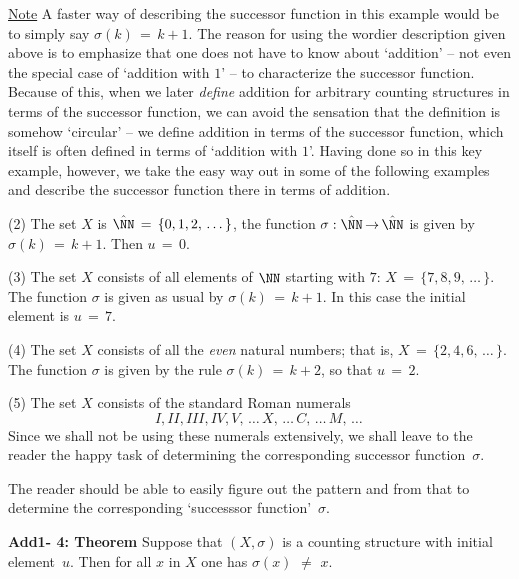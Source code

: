         \underline{Note} A faster way of describing the successor function in this example would be to simply say ${\sigma}(k) \,=\, k+1$.
    The reason for using the wordier description given above is to emphasize that one does not have to know about `addition' --
    not even the special case of `addition with $1$' -- to characterize the successor function.
    Because of this, when we later {\em define} addition for arbitrary counting structures in terms of the successor function,
    we can avoid the sensation that the definition is somehow `circular' -- we define addition in terms of the successor function,
        which itself is often defined in terms of `addition with $1$'.
    Having done so in this key example, however, we take the easy way out in some of the following examples
    and describe the successor function there in terms of addition.

\V

        (2) The set $X$ is $\hat{{\NN}} \,=\, \{0,1,2,\,{\ldots}\,\}$, the function ${\sigma}:\hat{{\NN}} \,{\rightarrow}\, \hat{{\NN}}$ is given by ${\sigma}(k) \,=\, k+1$.
    Then $u \,=\, 0$.

\V

        (3) The set $X$ consists of all elements of ${\NN}$ starting with $7$:
    $X \,=\, \{7, 8, 9, \,{\ldots}\,\}$.
    The function ${\sigma}$ is given as usual by ${\sigma}(k) \,=\, k+1$.
    In this case the initial element is $u \,=\, 7$.

\V

        (4) The set $X$ consists of all the {\em even} natural numbers; that is, $X \,=\, \{2,4,6,\,{\ldots}\,\}$.
    The function ${\sigma}$ is given by the rule ${\sigma}(k) \,=\, k+2$, so that $u \,=\, 2$.

\V

        (5) The set $X$ consists of the standard Roman numerals
        \begin{displaymath}
        I, II, III, IV, V,\,{\ldots}\,X,\,{\ldots}\,C,\,{\ldots}\,M,\,{\ldots}\,
        \end{displaymath}
    Since we shall not be using these numerals extensively, we shall leave to the reader the happy task of determining the corresponding successor function~${\sigma}$.

    The reader should be able to easily figure out the pattern and from that to determine the corresponding `successsor function'~${\sigma}$.

\V
\V

        {\bf Add1- 4: Theorem} Suppose that $(X,{\sigma})$ is a counting structure with initial element~$u$.
    Then for all $x$ in $X$ one has ${\sigma}(x) \,\,{\neq}\,\, x$.

